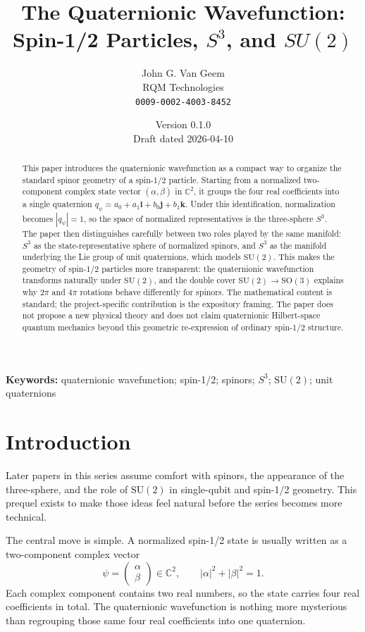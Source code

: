 \documentclass[11pt]{article}
\title{\textbf{The Quaternionic Wavefunction:}\\ \textbf{Spin-1/2 Particles, \texorpdfstring{$S^3$}{S3}, and \texorpdfstring{$SU(2)$}{SU(2)}}}
\author{John G. Van Geem\\RQM Technologies\\\texttt{0009-0002-4003-8452}}
\date{Version 0.1.0 \\ Draft dated 2026-04-10}
\theoremstyle{remark}
\newcommand{\C}{\mathbb{C}}
\newcommand{\SU}{\mathrm{SU}}
\newcommand{\SO}{\mathrm{SO}}
\newcommand{\ii}{\mathbf{i}}
\newcommand{\jj}{\mathbf{j}}
\newcommand{\kk}{\mathbf{k}}
\newcommand{\abs}[1]{\left\lvert #1 \right\rvert}
\begin{document}
\maketitle

\begin{abstract}
This paper introduces the quaternionic wavefunction as a compact way to organize the standard spinor geometry of a spin-1/2 particle. Starting from a normalized two-component complex state vector $(\alpha,\beta)$ in $\C^2$, it groups the four real coefficients into a single quaternion $q_\psi = a_0 + a_1\ii + b_0\jj + b_1\kk$. Under this identification, normalization becomes $\abs{q_\psi}=1$, so the space of normalized representatives is the three-sphere $S^3$. The paper then distinguishes carefully between two roles played by the same manifold: $S^3$ as the state-representative sphere of normalized spinors, and $S^3$ as the manifold underlying the Lie group of unit quaternions, which models $\SU(2)$. This makes the geometry of spin-1/2 particles more transparent: the quaternionic wavefunction transforms naturally under $\SU(2)$, and the double cover $\SU(2)\to\SO(3)$ explains why $2\pi$ and $4\pi$ rotations behave differently for spinors. The mathematical content is standard; the project-specific contribution is the expository framing. The paper does not propose a new physical theory and does not claim quaternionic Hilbert-space quantum mechanics beyond this geometric re-expression of ordinary spin-1/2 structure.
\end{abstract}

\noindent\textbf{Keywords:} quaternionic wavefunction; spin-1/2; spinors; $S^3$; $\SU(2)$; unit quaternions

\section{Introduction}

Later papers in this series assume comfort with spinors, the appearance of the three-sphere, and the role of $\SU(2)$ in single-qubit and spin-1/2 geometry. This prequel exists to make those ideas feel natural before the series becomes more technical.

The central move is simple. A normalized spin-1/2 state is usually written as a two-component complex vector
\[
\psi = \begin{pmatrix} \alpha \\ \beta \end{pmatrix} \in \C^2,
\qquad
\abs{\alpha}^2 + \abs{\beta}^2 = 1.
\]
Each complex component contains two real numbers, so the state carries four real coefficients in total. The quaternionic wavefunction is nothing more mysterious than regrouping those same four real coefficients into one quaternion.
\end{document}
